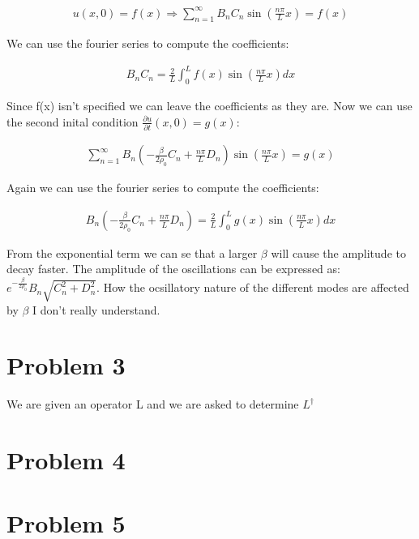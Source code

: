 \documentclass[a4paper]{article}
\begin{document}
\begin{align*}
    u(x,0) = f(x) \Rightarrow \sum_{n=1}^{\infty} B_n C_n \sin\left(\frac{n\pi}{L}x\right) = f(x)
\end{align*}

We can use the fourier series to compute the coefficients:

\begin{align*}
    B_nC_n = \frac{2}{L} \int_0^L f(x) \sin\left(\frac{n\pi}{L}x\right) dx
\end{align*}

Since f(x) isn't specified we can leave the coefficients as they are. Now we can use the second inital condition $\frac{\partial u}{\partial t}(x,0) = g(x)$:

\begin{align*}
    \sum_{n=1}^{\infty} B_n(-\frac{\beta}{2 \rho_0}C_n + \frac{n\pi}{L}D_n)\sin\left(\frac{n\pi}{L}x\right) = g(x)
\end{align*}

Again we can use the fourier series to compute the coefficients:

\begin{align*}
    B_n(-\frac{\beta}{2 \rho_0}C_n + \frac{n\pi}{L}D_n) = \frac{2}{L} \int_0^L g(x) \sin\left(\frac{n\pi}{L}x\right) dx
\end{align*}

From the exponential term we can se that a larger $\beta$ will cause the amplitude to decay faster. The amplitude of the oscillations can be expressed as: $e^{-\frac{\beta}{2 \rho_0}}B_n\sqrt{C_n^2+D_n^2}$. How the ocsillatory nature of the different modes are affected by $\beta$ I don't really understand. 

\section*{Problem 3}

We are given an operator L and we are asked to determine $L^\dagger$

\section*{Problem 4}


\section*{Problem 5}
\end{document}
